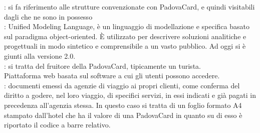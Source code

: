 : si fa riferimento alle strutture convenzionate con PadovaCard, e quindi visitabili dagli  che ne sono in possesso \\
: Unified Modeling Language, è un linguaggio di modellazione e specifica basato sul paradigma object-oriented. 
È utilizzato per descrivere soluzioni analitiche e progettuali in modo sintetico e comprensibile a un vasto pubblico. Ad oggi si è giunti alla versione 2.0. \\
: si tratta del fruitore della PadovaCard, tipicamente un turista.\\
 Piattaforma web basata sul software \tlite a cui gli utenti possono accedere. \\
: documenti emessi da agenzie di viaggio ai propri clienti, come conferma del diritto a godere, nel loro viaggio, di specifici servizi, in essi indicati e già pagati in precedenza all'agenzia stessa. In questo caso si tratta di un foglio formato A4 stampato dall'hotel che ha il valore di una PadovaCard in quanto su di esso è riportato il codice a barre relativo. \\
